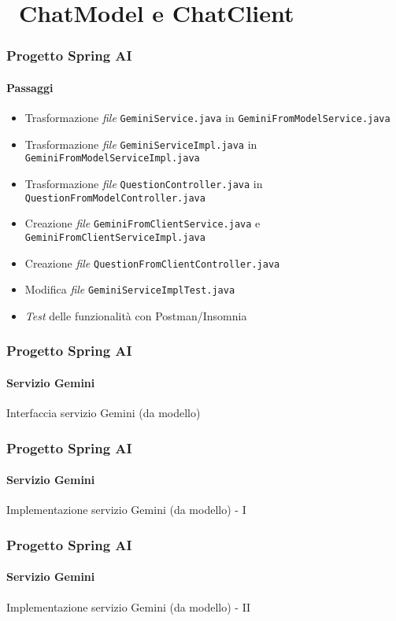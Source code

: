 \section{\faWrench\ ChatModel e ChatClient} %
\label{sec:spring-ai-gemini-chatmodel-vs-chatclient}
%
\begin{frame}[t,fragile] \frametitle{Progetto Spring AI}
    \framesubtitle{Passaggi}
	\begin{itemize}[leftmargin=10pt,align=right]
		\item[\alertedcircled{1}] Trasformazione \textit{file} \texttt{GeminiService.java} in \texttt{GeminiFromModelService.java}
        \item[\alertedcircled{2}] Trasformazione \textit{file} \texttt{GeminiServiceImpl.java} in \texttt{GeminiFromModelServiceImpl.java}
        \item[\alertedcircled{3}] Trasformazione \textit{file} \texttt{QuestionController.java} in \texttt{QuestionFromModelController.java}
        \item[\alertedcircled{4}] Creazione \textit{file} \texttt{GeminiFromClientService.java} e \texttt{GeminiFromClientServiceImpl.java}
        \item[\alertedcircled{5}] Creazione \textit{file} \texttt{QuestionFromClientController.java}
        \item[\alertedcircled{6}] Modifica \textit{file} \texttt{GeminiServiceImplTest.java}
        \item[\alertedcircled{7}] \textit{Test} delle funzionalità con Postman/Insomnia
	\end{itemize}
\end{frame}
%
\begin{frame}[t,fragile] \frametitle{Progetto Spring AI}
    \framesubtitle{Servizio Gemini}
        \begin{block}{Interfaccia servizio Gemini (da modello)}
{\tiny}
    \end{block}
\end{frame}
%
\begin{frame}[t,fragile] \frametitle{Progetto Spring AI}
    \framesubtitle{Servizio Gemini}
		\vspace*{-.7cm}
        \begin{block}{Implementazione servizio Gemini (da modello) - I}
            {\tiny}
    \end{block}
\end{frame}
%
\begin{frame}[t,fragile] \frametitle{Progetto Spring AI}
    \framesubtitle{Servizio Gemini}
        \begin{block}{Implementazione servizio Gemini (da modello) - II}
            {\tiny}
    \end{block}
\end{frame}
